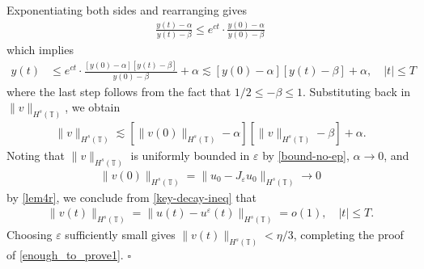 \documentclass[12pt,reqno]{amsart}
\renewcommand{\qedsymbol}{\ensuremath{\square}}
\newcommand{\ci}{\mathbb{T}}
\newcommand{\ee}{\varepsilon}
\theoremstyle{plain}  %
\theoremstyle{definition}
\begin{document}
%
%
Exponentiating both sides and rearranging gives
%
%
\begin{equation*}
	\begin{split}
		\frac{y(t) - \alpha}{y(t) - \beta} \le e^{ct} \cdot
		\frac{y(0) - \alpha}{y(0) - \beta}	
	\end{split}
\end{equation*}
%
%
which implies
%
%
\begin{equation*}
	\begin{split}
		y(t) 
		& \le e^{ct} \cdot \frac{ \left [y(0) - \alpha \right ]
		\left [y(t) - \beta \right ]}{y(0) - 
		\beta} + \alpha
		 \lesssim \left [y(0) - \alpha \right ] \left [y(t) - \beta \right ] + \alpha, \quad |t| \le T
	\end{split}
\end{equation*}
%
%
where the last step follows from the fact that $1/2 \le -\beta \le 1$.  Substituting back in $\|v\|_{H^s(\ci)}$, we obtain
\begin{equation}
	\label{key-decay-ineq}
	\begin{split}
		\|v\|_{H^s(\ci)}  \lesssim \left [\|v(0)\|_{H^s(\ci)} - 
		\alpha \right ] \left [\|v\|_{H^s(\ci)} - \beta \right ] + \alpha.
	\end{split}
\end{equation}
Noting that $\|v\|_{H^s(\ci)}$ is uniformly bounded in $\ee$ by 
\eqref{bound-no-ep}, $\alpha \to 0$, and
%
%
\begin{equation*}
\label{303''qx}
\begin{split}
\|v(0)\|_{H^s(\ci)} = \|u_0 - J_\ee u_0 \|_{H^s(\ci)} \to 0 \end{split}
\end{equation*}
by  \autoref{lem4r}, we conclude from \eqref{key-decay-ineq} that
%
%
\begin{equation}
\label{304qx}
\begin{split}
\|v(t)\|_{H^s(\ci)} = 
\|u(t) - u^\ee(t) \|_{H^s(\ci)}= o(1), \quad |t| \le T.
\end{split}
\end{equation}
%
%
Choosing $\ee$ sufficiently small gives $\|v(t)\|_{H^s(\ci)} < \eta/3$, 
completing the proof of \eqref{enough_to_prove1}. \qquad \qedsymbol
%
%
%
%
%
\end{document}
